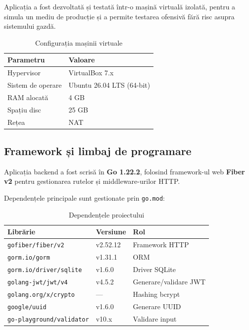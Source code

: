 \documentclass[12pt]{article}
\begin{document}
Aplicația a fost dezvoltată și testată într-o mașină virtuală izolată, pentru a simula un mediu
de producție și a permite testarea ofensivă fără risc asupra sistemului gazdă.

\begin{table}[H]
\centering
\begin{tabular}{|l|l|}
\hline
\textbf{Parametru}   & \textbf{Valoare} \\
\hline
Hypervisor           & VirtualBox 7.x \\
Sistem de operare    & Ubuntu 26.04 LTS (64-bit) \\
RAM alocată          & 4 GB \\
Spațiu disc          & 25 GB \\
Rețea                & NAT \\
\hline
\end{tabular}
\caption{Configurația mașinii virtuale}
\end{table}

\subsection{Framework și limbaj de programare}

Aplicația backend a fost scrisă în \textbf{Go 1.22.2}, folosind framework-ul web
\textbf{Fiber v2} pentru gestionarea rutelor și middleware-urilor HTTP.

Dependențele principale sunt gestionate prin \texttt{go.mod}:

\begin{table}[H]
\centering
\begin{tabular}{|l|l|l|}
\hline
\textbf{Librărie} & \textbf{Versiune} & \textbf{Rol} \\
\hline
\texttt{gofiber/fiber/v2}        & v2.52.12 & Framework HTTP \\
\texttt{gorm.io/gorm}            & v1.31.1  & ORM \\
\texttt{gorm.io/driver/sqlite}   & v1.6.0   & Driver SQLite \\
\texttt{golang-jwt/jwt/v4}       & v4.5.2   & Generare/validare JWT \\
\texttt{golang.org/x/crypto}     & ---      & Hashing bcrypt \\
\texttt{google/uuid}             & v1.6.0   & Generare UUID \\
\texttt{go-playground/validator} & v10.x    & Validare input \\
\hline
\end{tabular}
\caption{Dependențele proiectului}
\end{table}
\end{document}
